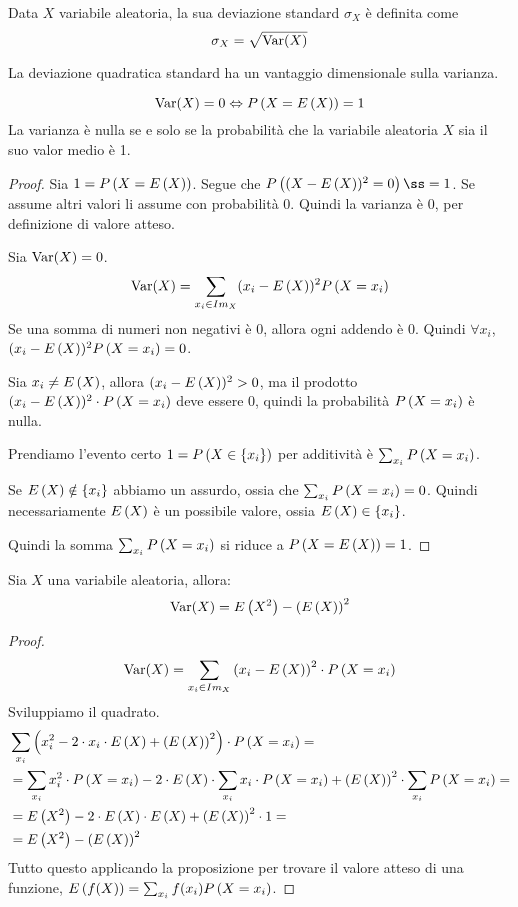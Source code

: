 \begin{defn}
Data $X$ variabile aleatoria, la sua deviazione standard $\sigma_X$ \`e definita come
\[
\sigma_X = \sqrt{ \operatorname{Var} (X)}
\]
\end{defn}
La deviazione quadratica standard ha un vantaggio dimensionale sulla varianza.
\begin{fact}
\[
\operatorname{Var} (X) = 0 \Leftrightarrow P \left( {X = E \left( X \right)} \right) = 1
\]
La varianza \`e nulla se e solo se la probabilit\`a che la variabile aleatoria $X$ sia il suo valor medio \`e 1.
\end{fact}
\begin{proof}
Sia $1 = P \left( {X = E \left( X \right)} \right)$. Segue che $\prob{(X-\expect{X})^2 = 0}ß = 1$. Se assume altri valori li assume con probabilit\`a 0. Quindi la varianza \`e 0, per definizione di valore atteso.

Sia $\operatorname{Var} (X) = 0$.
\[
\operatorname{Var} (X) = \sum_{x_i \in Im_{X}} (x_i - E \left( X \right))^2 P \left( {X = x_i} \right)
\]
Se una somma di numeri non negativi \`e 0, allora ogni addendo \`e 0. Quindi $\forall x_i$, $ (x_i - E \left( X \right))^2 P \left( {X = x_i} \right) = 0$.

Sia $x_i \neq E \left( X \right)$, allora $(x_i - E \left( X \right))^2 > 0$, ma il prodotto $(x_i - E \left( X \right))^2 \cdot P \left( {X = x_i} \right)$ deve essere 0, quindi la probabilit\`a $P \left( {X = x_i} \right)$ \`e nulla.

Prendiamo l'evento certo $1 = P \left( {X \in \{ x_i \}} \right)$ per additivit\`a \`e $\sum_{x_i} P \left( {X = x_i} \right)$.

Se $E \left( X \right) \notin \{ x_i \}$ abbiamo un assurdo, ossia che $\sum_{x_i} P \left( {X = x_i} \right) = 0$. Quindi necessariamente $E \left( X \right)$ \`e un possibile valore, ossia $E \left( X \right) \in \{x_i\}$.

Quindi la somma $\sum_{x_i} P \left( {X = x_i} \right)$ si riduce a $P \left( {X = E \left( X \right)} \right) = 1$.
\end{proof}

\begin{prop}
Sia $X$ una variabile aleatoria, allora:
\[
\operatorname{Var} (X) = E \left( X^2 \right) - {\left( E \left( X \right) \right)}^2
\]
\end{prop}
\begin{proof}
\[
\operatorname{Var} (X) = \sum_{x_i \in Im_{X}} {\left( x_i - E \left( X \right) \right)}^2 \cdot P \left( {X = x_i} \right)
\]
Sviluppiamo il quadrato.
\begin{align*}
& \sum_{x_i} \left( x_i^2 - 2 \cdot x_i \cdot E \left( X \right) + {\left( E \left( X \right) \right)}^2 \right) \cdot P \left( {X = x_i} \right) = \\
&= \sum_{x_i} x_i^2 \cdot P \left( {X = x_i} \right) - 2 \cdot E \left( X \right) \cdot \sum_{x_i} x_i \cdot P \left( {X = x_i} \right) + {\left( E \left( X \right) \right)}^2 \cdot \sum_{x_i} P \left( {X = x_i} \right) = \\
&= E \left( X^2 \right) - 2 \cdot E \left( X \right) \cdot E \left( X \right) + {\left( E \left( X \right) \right)}^2 \cdot 1 = \\
&= E \left( X^2 \right) - {\left( E \left( X \right) \right)}^2
\end{align*}
Tutto questo applicando la proposizione per trovare il valore atteso di una funzione, $E \left( f(X) \right) = \sum_{x_i} f(x_i) P \left( {X = x_i} \right)$.
\end{proof}

